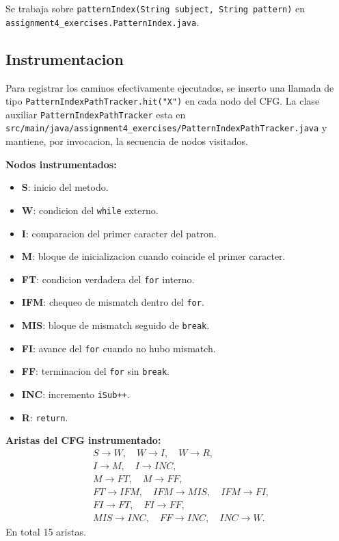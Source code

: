 \documentclass[12pt,a4paper]{article}
\begin{document}
Se trabaja sobre \texttt{patternIndex(String subject, String pattern)} en
\texttt{assignment4\_exercises.PatternIndex.java}.

\subsection{Instrumentacion}

Para registrar los caminos efectivamente ejecutados, se inserto una llamada de tipo
\texttt{PatternIndexPathTracker.hit("X")} en cada nodo del CFG. La clase auxiliar
\texttt{PatternIndexPathTracker} esta en
\texttt{src/main/java/assignment4\_exercises/PatternIndexPathTracker.java} y mantiene, por
invocacion, la secuencia de nodos visitados.

\textbf{Nodos instrumentados:}
\begin{itemize}
  \item \textbf{S}: inicio del metodo.
  \item \textbf{W}: condicion del \texttt{while} externo.
  \item \textbf{I}: comparacion del primer caracter del patron.
  \item \textbf{M}: bloque de inicializacion cuando coincide el primer caracter.
  \item \textbf{FT}: condicion verdadera del \texttt{for} interno.
  \item \textbf{IFM}: chequeo de mismatch dentro del \texttt{for}.
  \item \textbf{MIS}: bloque de mismatch seguido de \texttt{break}.
  \item \textbf{FI}: avance del \texttt{for} cuando no hubo mismatch.
  \item \textbf{FF}: terminacion del \texttt{for} sin \texttt{break}.
  \item \textbf{INC}: incremento \texttt{iSub++}.
  \item \textbf{R}: \texttt{return}.
\end{itemize}

\textbf{Aristas del CFG instrumentado:}
\[
\begin{aligned}
&S \to W,\quad W \to I,\quad W \to R, \\
&I \to M,\quad I \to INC, \\
&M \to FT,\quad M \to FF, \\
&FT \to IFM,\quad IFM \to MIS,\quad IFM \to FI, \\
&FI \to FT,\quad FI \to FF, \\
&MIS \to INC,\quad FF \to INC,\quad INC \to W.
\end{aligned}
\]
En total 15 aristas.
\end{document}
